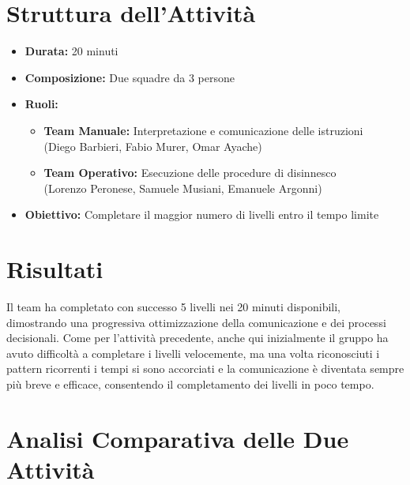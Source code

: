 \documentclass{article}
\begin{document}
\section*{Struttura dell'Attività}
\begin{itemize}
    \item \textbf{Durata:} 20 minuti
    \item \textbf{Composizione:} Due squadre da 3 persone
    \item \textbf{Ruoli:}
    \begin{itemize}
        \item \textbf{Team Manuale:} Interpretazione e comunicazione delle istruzioni\\
        (Diego Barbieri, Fabio Murer, Omar Ayache)
        \item \textbf{Team Operativo:} Esecuzione delle procedure di disinnesco\\
        (Lorenzo Peronese, Samuele Musiani, Emanuele Argonni)
    \end{itemize}
    \item \textbf{Obiettivo:} Completare il maggior numero di livelli entro il tempo limite
\end{itemize}

\section*{Risultati}
Il team ha completato con successo 5 livelli nei 20 minuti disponibili, 
dimostrando una progressiva ottimizzazione della comunicazione e dei processi 
decisionali. Come per l'attività precedente, anche qui inizialmente il gruppo ha 
avuto difficoltà a completare i livelli velocemente, ma una volta riconosciuti 
i pattern ricorrenti i tempi si sono accorciati e la comunicazione è diventata 
sempre più breve e efficace, consentendo il completamento dei livelli in poco tempo.

\section*{Analisi Comparativa delle Due Attività}
\end{document}
